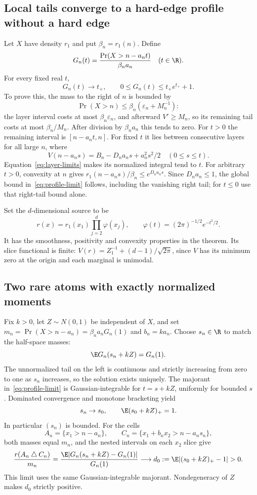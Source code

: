 \subsection*{Local tails converge to a hard-edge profile without a hard edge}
Let $X$ have density $r_1$ and put $\beta_n=r_1(n)$. Define
\[
 G_n(t)=\frac{\Pr(X>n-a_nt)}{\beta_na_n}\quad(t\in\R).
\]
For every fixed real $t$,
\begin{equation}\label{eq:profile-limit}
 G_n(t)\longrightarrow t_+,
 \qquad
 0\le G_n(t)\le t_+e^{t_+}+1.
\end{equation}
To prove this, the mass to the right of $n$ is bounded by
\[
 \Pr(X>n)\le\beta_n(\varepsilon_n+M_n^{-1}):
\]
the layer interval costs at most $\beta_n\varepsilon_n$, and afterward $V'\ge M_n$, so its remaining tail costs at most $\beta_n/M_n$. After division by $\beta_na_n$ this tends to zero. For $t>0$ the remaining interval is $[n-a_nt,n]$. For fixed $t$ it lies between consecutive layers for all large $n$, where
\[
 V(n-a_ns)=B_n-D_na_ns+a_n^2s^2/2\quad(0\le s\le t).
\]
Equation~\eqref{eq:layer-limits} makes its normalized integral tend to $t$. For arbitrary $t>0$, convexity at $n$ gives
$r_1(n-a_ns)/\beta_n\le e^{D_na_ns}$. Since $D_na_n\le1$, the global bound in~\eqref{eq:profile-limit} follows, including the vanishing right tail; for $t\le0$ use that right-tail bound alone.

Set the $d$-dimensional source to be
\[
 r(x)=r_1(x_1)\prod_{j=2}^d\varphi(x_j),
 \qquad \varphi(t)=(2\pi)^{-1/2}e^{-t^2/2}.
\]
It has the smoothness, positivity and convexity properties in the theorem. Its slice functional is finite: $V(r)=Z_1^{-1}+(d-1)/\sqrt{2\pi}$, since $V$ has its minimum zero at the origin and each marginal is unimodal.

\subsection*{Two rare atoms with exactly normalized moments}
Fix $k>0$, let $Z\sim N(0,1)$ be independent of $X$, and set
$m_n=\Pr(X>n-a_n)=\beta_na_nG_n(1)$ and $b_n=ka_n$.
Choose $s_n\in\R$ to match the half-space masses:
\begin{equation}\label{eq:layer-mass-match}
 \E G_n(s_n+kZ)=G_n(1).
\end{equation}
The unnormalized tail on the left is continuous and strictly increasing from zero to one as $s_n$ increases, so the solution exists uniquely. The majorant in~\eqref{eq:profile-limit} is Gaussian-integrable for $t=s+kZ$, uniformly for bounded $s$. Dominated convergence and monotone bracketing yield
\[
 s_n\to s_0,\qquad \E(s_0+kZ)_+=1.
\]
In particular $(s_n)$ is bounded. For the cells
\[
 A_n=\{x_1>n-a_n\},\qquad
 C_n=\{x_1+b_nx_2>n-a_ns_n\},
\]
both masses equal $m_n$, and the nested intervals on each $x_2$ slice give
\begin{equation}\label{eq:layer-symdiff}
 \frac{r(A_n\mathbin\triangle C_n)}{m_n}
 =\frac{\E|G_n(s_n+kZ)-G_n(1)|}{G_n(1)}
 \longrightarrow d_0:=\E|(s_0+kZ)_+-1|>0.
\end{equation}
This limit uses the same Gaussian-integrable majorant. Nondegeneracy of $Z$ makes $d_0$ strictly positive.

